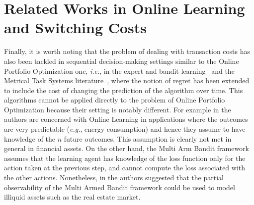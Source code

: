 \section{Related Works in Online Learning and Switching Costs}
Finally, it is worth noting that the problem of dealing with transaction costs has also been tackled in sequential decision-making settings similar to the Online Portfolio Optimization one, \emph{i.e.}, in the expert and bandit learning~\cite{li2018online,cesa2013online,trovo2016budgeted} and the Metrical Task Systems literature~\cite{lin2012online}, where the notion of regret has been extended to include the cost of changing the prediction of the algorithm over time. This algorithms cannot be applied directly to the problem of Online Portfolio Optimization because their setting is notably different. 
For example in \cite{li2018online} the authors are concerned with Online Learning in applications where the outcomes are very predictable (\emph{e.g.}, energy consumption) and hence they assume to have knowledge of the $n$ future outcomes. This assumption is clearly not met in general in financial assets.
On the other hand, the Multi Arm Bandit framework assumes that the learning agent has knowledge of the loss function only for the action taken at the previous step, and cannot compute the loss associated with the other actions. Nonetheless, in \cite{ito2018regret} the authors suggested that the partial observability of the Multi Armed Bandit framework could be used to model illiquid assets such as the real estate market.
